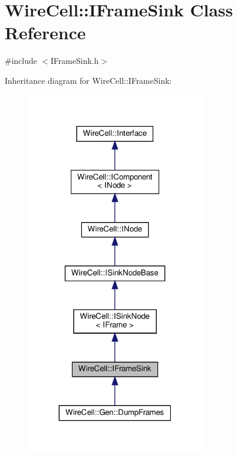 \hypertarget{class_wire_cell_1_1_i_frame_sink}{}\section{Wire\+Cell\+:\+:I\+Frame\+Sink Class Reference}
\label{class_wire_cell_1_1_i_frame_sink}


{\ttfamily \#include $<$I\+Frame\+Sink.\+h$>$}



Inheritance diagram for Wire\+Cell\+:\+:I\+Frame\+Sink\+:
\nopagebreak
\begin{figure}[H]
\begin{center}
\leavevmode
\includegraphics[width=223pt]{class_wire_cell_1_1_i_frame_sink__inherit__graph}
\end{center}
\end{figure}


